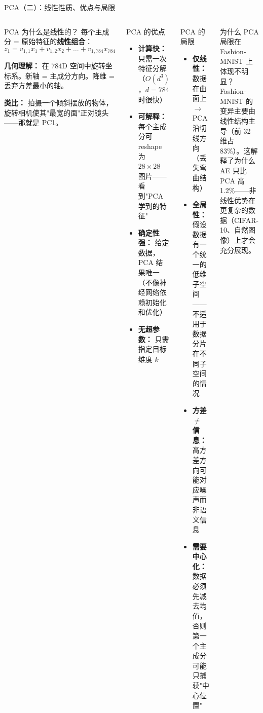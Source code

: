 \documentclass[aspectratio=169]{ctexbeamer}
\begin{document}
\begin{frame}[shrink=10]{PCA（二）：线性性质、优点与局限}
\small

\begin{columns}[T]
\begin{block}{PCA 为什么是线性的？}
\footnotesize
每个主成分 = 原始特征的\textbf{线性组合}：
\[
z_1 = v_{1,1}x_1 + v_{1,2}x_2 + \dots + v_{1,784}x_{784}
\]

\textbf{几何理解：} 在 784D 空间中旋转坐标系。新轴 = 主成分方向。降维 = 丢弃方差最小的轴。

\textbf{类比：} 拍摄一个倾斜摆放的物体，旋转相机使其"最宽的面"正对镜头——那就是 PC1。
\end{block}

\vspace{0.1cm}

\begin{block}{PCA 的优点}
\footnotesize
\begin{itemize}
  \item \textbf{计算快：} 只需一次特征分解（$O(d^3)$，$d=784$ 时很快）
  \item \textbf{可解释：} 每个主成分可 reshape 为 $28\times28$ 图片——看到"PCA 学到的特征"
  \item \textbf{确定性强：} 给定数据，PCA 结果唯一（不像神经网络依赖初始化和优化）
  \item \textbf{无超参数：} 只需指定目标维度 $k$
\end{itemize}
\end{block}

\begin{block}{PCA 的局限}
\footnotesize
\begin{itemize}
  \item \textbf{仅线性：} 数据在曲面上 $\to$ PCA 沿切线方向（丢失弯曲结构）
  \item \textbf{全局性：} 假设数据有一个统一的低维子空间——不适用于数据分片在不同子空间的情况
  \item \textbf{方差 $\neq$ 信息：} 高方差方向可能对应噪声而非语义信息
  \item \textbf{需要中心化：} 数据必须先减去均值，否则第一个主成分可能只捕获"中心位置"
\end{itemize}
\end{block}

\vspace{0.1cm}

\begin{exampleblock}{为什么 PCA 局限在 Fashion-MNIST 上体现不明显？}
\footnotesize
Fashion-MNIST 的变异主要由线性结构主导（前 32 维占 83\%）。这解释了为什么 AE 只比 PCA 高 1.2\%——非线性优势在更复杂的数据（CIFAR-10、自然图像）上才会充分展现。
\end{exampleblock}
\end{columns}
\end{frame}
\end{document}
